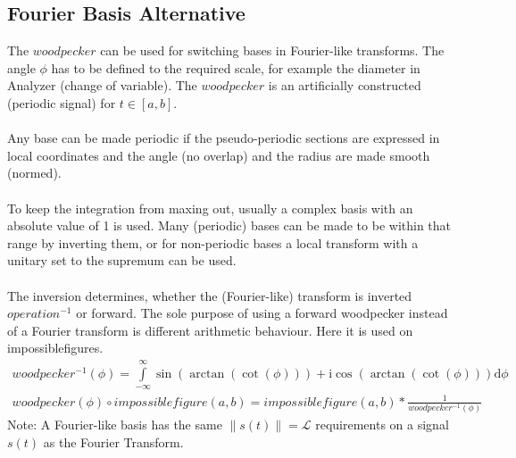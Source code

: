 \documentclass{report}
\newcommand\norm[1]{\left\lVert#1\right\rVert}
\begin{document}
\subsection{Fourier Basis Alternative}
The $woodpecker$ can be used for switching bases in Fourier-like transforms. The angle $\phi$ has to be defined to the required scale, for example the diameter in Analyzer (change of variable). The $woodpecker$ is an artificially constructed (periodic signal) for $t \in [a,b]$.\\\\
Any base can be made periodic if the pseudo-periodic sections are expressed in local coordinates and the angle (no overlap) and the radius are made smooth (normed).\\\\
To keep the integration from maxing out, usually a complex basis with an absolute value of 1 is used. Many (periodic) bases can be made to be within that range by inverting them, or for non-periodic bases a local transform with a unitary set to the supremum can be used.\\\\
The inversion determines, whether the (Fourier-like) transform is inverted $operation^{-1}$ or forward. The sole purpose of using a forward woodpecker instead of a Fourier transform is different arithmetic behaviour. Here it is used on impossiblefigures.
\begin{align}
woodpecker^{-1}(\phi)=\int \limits _{-\infty}^{\infty}\sin(\arctan(\cot(\phi))) + \mathrm{i} \cos(\arctan(\cot(\phi)))\mathrm{d}\phi\\
woodpecker(\phi) \circ impossiblefigure(a,b)=impossiblefigure(a,b)*\frac{1}{woodpecker^{-1}(\phi)}
\end{align}
Note: A Fourier-like basis has the same $\norm{s(t)}=\mathcal{L}$ requirements on a signal $s(t)$ as the Fourier Transform.
\end{document}
